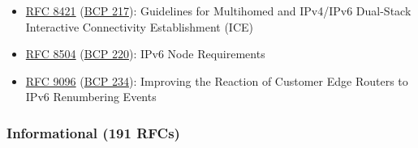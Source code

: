 \documentclass[
]{article}
\begin{document}
\begin{itemize}
\item
  \href{https://www.rfc-editor.org/info/rfc8421}{RFC 8421}
  (\href{https://www.rfc-editor.org/info/bcp217}{BCP 217}): Guidelines
  for Multihomed and IPv4/IPv6 Dual-Stack Interactive Connectivity
  Establishment (ICE)
\item
  \href{https://www.rfc-editor.org/info/rfc8504}{RFC 8504}
  (\href{https://www.rfc-editor.org/info/bcp220}{BCP 220}): IPv6 Node
  Requirements
\item
  \href{https://www.rfc-editor.org/info/rfc9096}{RFC 9096}
  (\href{https://www.rfc-editor.org/info/bcp234}{BCP 234}): Improving
  the Reaction of Customer Edge Routers to IPv6 Renumbering Events
\end{itemize}

\subsubsection{Informational (191 RFCs)}\label{informational-191-rfcs}
\end{document}
